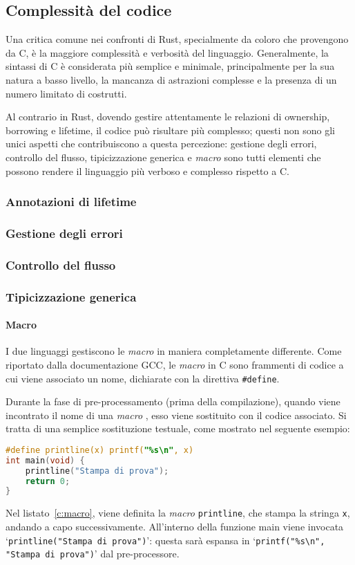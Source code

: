 \subsection{Complessità del codice}
Una critica comune nei confronti di Rust, specialmente da coloro che provengono da C, è la maggiore complessità e verbosità del linguaggio.
Generalmente, la sintassi di C è considerata più semplice e minimale, principalmente per la sua natura a basso livello, la mancanza di astrazioni
complesse e la presenza di un numero limitato di costrutti.

Al contrario in Rust, dovendo gestire attentamente le relazioni di ownership, borrowing e lifetime, il codice può risultare più complesso; 
questi non sono gli unici aspetti che contribuiscono a questa percezione: gestione degli errori, controllo del flusso, tipicizzazione generica e \textit{macro} sono
tutti elementi che possono rendere il linguaggio più verboso e complesso rispetto a C.

\subsubsection{Annotazioni di lifetime}

\subsubsection{Gestione degli errori}

\subsubsection{Controllo del flusso}

\subsubsection{Tipicizzazione generica}

\paragraph{Macro}
I due linguaggi gestiscono le \textit{macro} in maniera completamente differente.
Come riportato dalla documentazione GCC\cite{GNU-online-docs}, le \textit{macro} in C sono frammenti di codice a cui viene associato un nome, dichiarate con la direttiva \texttt{\#define}. 

Durante la fase di pre-processamento (prima della compilazione),
quando viene incontrato il nome di una \textit{macro} , esso viene sostituito con il codice associato. Si tratta di una semplice sostituzione testuale, come
mostrato nel seguente esempio:
\begin{lstlisting}[language=C, caption={Definizione di \textit{macro} in C}, label={c:macro}]
#define printline(x) printf("%s\n", x)
int main(void) {
    printline("Stampa di prova");
    return 0;
}
\end{lstlisting}
Nel listato~\ref{c:macro}, viene definita la \textit{macro} \texttt{printline}, che stampa la stringa \texttt{x}, andando a capo successivamente.
All'interno della funzione main viene invocata `\texttt{printline("Stampa di prova")}': questa sarà espansa in `\texttt{printf("\%s\textbackslash n", "Stampa di prova")}' dal pre-processore. 

